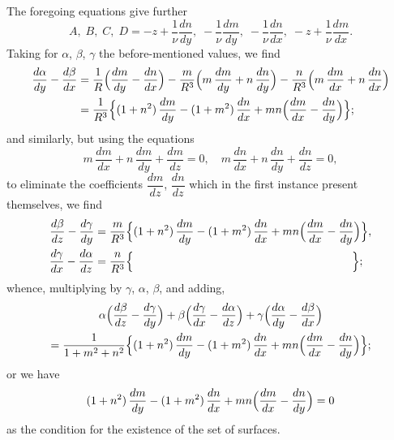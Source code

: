 \documentclass[11pt,a4paper]{book}
\begin{document}
The foregoing equations give further
\[
A,\; B,\; C,\; D = -z + \frac{1}{\nu}\frac{dn}{dy},\; -\frac{1}{\nu}\frac{dm}{dy},\; -\frac{1}{\nu}\frac{dn}{dx},\; -z + \frac{1}{\nu}\frac{dm}{dx}.
\]
Taking for $\alpha$, $\beta$, $\gamma$ the before-mentioned values, we find
\begin{align*}
\frac{d\alpha}{dy} - \frac{d\beta}{dx} &= \frac{1}{R}\Bigl(\frac{dm}{dy} - \frac{dn}{dx}\Bigr) - \frac{m}{R^3}\Bigl(m\,\frac{dm}{dy} + n\,\frac{dn}{dy}\Bigr) - \frac{n}{R^3}\Bigl(m\,\frac{dm}{dx} + n\,\frac{dn}{dx}\Bigr) \\
&= \frac{1}{R^3}\Bigl\{(1+n^2)\,\frac{dm}{dy} - (1+m^2)\,\frac{dn}{dx} + mn\Bigl(\frac{dm}{dx} - \frac{dn}{dy}\Bigr)\Bigr\};
\end{align*}
and similarly, but using the equations
\[
m\,\frac{dm}{dx} + n\,\frac{dm}{dy} + \frac{dm}{dz} = 0, \quad m\,\frac{dn}{dx} + n\,\frac{dn}{dy} + \frac{dn}{dz} = 0,
\]
to eliminate the coefficients $\dfrac{dm}{dz}$, $\dfrac{dn}{dz}$ which in the first instance present themselves, we find
\begin{align*}
\frac{d\beta}{dz} - \frac{d\gamma}{dy} &= \frac{m}{R^3}\Bigl\{(1+n^2)\,\frac{dm}{dy} - (1+m^2)\,\frac{dn}{dx} + mn\Bigl(\frac{dm}{dx} - \frac{dn}{dy}\Bigr)\Bigr\}, \\
\frac{d\gamma}{dx} - \frac{d\alpha}{dz} &= \frac{n}{R^3}\Bigl\{\qquad\qquad\qquad\qquad\qquad\qquad\qquad\qquad\qquad\quad\;\Bigr\};
\end{align*}
whence, multiplying by $\gamma$, $\alpha$, $\beta$, and adding,
\begin{multline*}
\alpha\Bigl(\frac{d\beta}{dz} - \frac{d\gamma}{dy}\Bigr) + \beta\Bigl(\frac{d\gamma}{dx} - \frac{d\alpha}{dz}\Bigr) + \gamma\Bigl(\frac{d\alpha}{dy} - \frac{d\beta}{dx}\Bigr) \\
= \frac{1}{1+m^2+n^2}\Bigl\{(1+n^2)\,\frac{dm}{dy} - (1+m^2)\,\frac{dn}{dx} + mn\Bigl(\frac{dm}{dx} - \frac{dn}{dy}\Bigr)\Bigr\};
\end{multline*}
or we have
\[
(1+n^2)\,\frac{dm}{dy} - (1+m^2)\,\frac{dn}{dx} + mn\Bigl(\frac{dm}{dx} - \frac{dn}{dy}\Bigr) = 0
\]
as the condition for the existence of the set of surfaces.

\newpage
\end{document}
